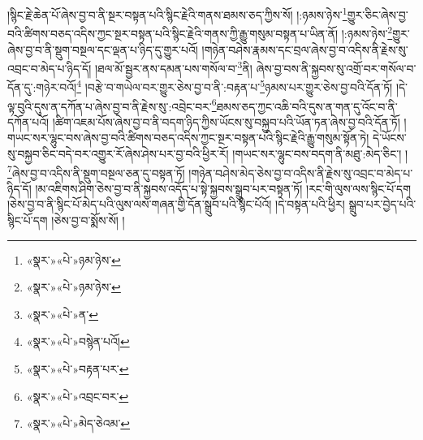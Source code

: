།སྙིང་རྗེ་ཆེན་པོ་ཞེས་བྱ་བ་ནི་སྔར་བསྟན་པའི་སྙིང་རྗེའི་གནས་ཐམས་ཅད་ཀྱིས་སོ། །:ཉམས་ཉེས་\footnote{«སྣར་»«པེ་»ཉམ་ཉེས་}གྱུར་ཅིང་ཞེས་བྱ་བའི་ཚིགས་བཅད་འདིས་ཀྱང་སྔར་བསྟན་པའི་སྙིང་རྗེའི་གནས་ཀྱི་རྒྱུ་གསུམ་བསྟན་པ་ཡིན་ནོ། །:ཉམས་ཉེས་\footnote{«སྣར་»«པེ་»ཉམ་ཉེས་}གྱུར་ཞེས་བྱ་བ་ནི་སྡུག་བསྔལ་དང་ལྡན་པ་ཉིད་དུ་གྱུར་པའོ། །གཉེན་བཤེས་རྣམས་དང་བྲལ་ཞེས་བྱ་བ་འདིས་ནི་རྗེས་སུ་འབྲང་བ་མེད་པ་ཉིད་དོ། །ཐལ་མོ་སྦྱར་ནས་དམན་པས་གསོལ་བ་\footnote{«སྣར་»«པེ་»ན་}ནི། ཞེས་བྱ་བས་ནི་སྐྱབས་སུ་འགྲོ་བར་གསོལ་བ་དོན་དུ་:གཉེར་བའོ།\footnote{«སྣར་»«པེ་»བསྙེན་པའོ།} །བརྩེ་བ་གཡེལ་བར་གྱུར་ཅེས་བྱ་བ་ནི་:བརྟན་པ་\footnote{«སྣར་»«པེ་»བརྟན་པར་}ཉམས་པར་གྱུར་ཅེས་བྱ་བའི་དོན་ཏོ། །དེ་ལྟ་བུའི་དུས་ན་དཀོན་པ་ཞེས་བྱ་བ་ནི་རྗེས་སུ་:འབྲེང་བར་\footnote{«སྣར་»«པེ་»འབྲང་བར་}ཐམས་ཅད་ཀྱང་འཆི་བའི་དུས་ན་གན་དུ་འོང་བ་ནི་དཀོན་པའོ། །ཚིག་འཇམ་པོས་ཞེས་བྱ་བ་ནི་བདག་ཉིད་ཀྱིས་ཡོངས་སུ་བསྐྱབ་པའི་ཡོན་ཏན་ཞེས་བྱ་བའི་དོན་ཏོ། །གཡང་སར་ལྷུང་བས་ཞེས་བྱ་བའི་ཚིགས་བཅད་འདིས་ཀྱང་སྔར་བསྟན་པའི་སྙིང་རྗེའི་རྒྱུ་གསུམ་སྟོན་ཏེ། དེ་ཡོངས་སུ་བསྐྱབ་ཅིང་བདེ་བར་འགྱུར་རོ་ཞེས་ཤེས་པར་བྱ་བའི་ཕྱིར་རོ། །གཡང་སར་ལྷུང་བས་བདག་ནི་མཐུ་:མེད་ཅིང་། །\footnote{«སྣར་»«པེ་»མེད་ཅེའམ་}ཞེས་བྱ་བ་འདིས་ནི་སྡུག་བསྔལ་ཅན་དུ་བསྟན་ཏོ། །གཉེན་བཤེས་མེད་ཅེས་བྱ་བ་འདིས་ནི་རྗེས་སུ་འབྲང་བ་མེད་པ་ཉིད་དོ། །མ་འཇིགས་ཤིག་ཅེས་བྱ་བ་ནི་སྐྱབས་འདོད་པ་སྟེ་སྐྱབས་སྒྲུབ་པར་བསྟན་ཏོ། །རང་གི་ལུས་ལས་སྙིང་པོ་དག །ཅེས་བྱ་བ་ནི་སྙིང་པོ་མེད་པའི་ལུས་ལས་གཞན་གྱི་དོན་སྒྲུབ་པའི་སྙིང་པོའོ། །དེ་བསྟན་པའི་ཕྱིར། སྒྲུབ་པར་བྱེད་པའི་སྙིང་པོ་དག །ཅེས་བྱ་བ་སྨོས་སོ། །
